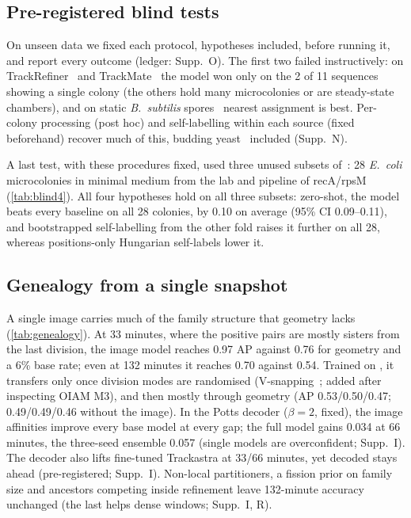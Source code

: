 

\subsection{Pre-registered blind tests}
On unseen data we fixed each protocol, hypotheses included, before running it, and report every outcome (ledger: Supp.~O).
The first two failed instructively: on TrackRefiner~\cite{ahmadi2025trackrefiner} and TrackMate~\cite{anselmet2026trackmate} the \rodsim model won only on the 2 of 11 sequences showing a single colony (the others hold many microcolonies or are steady-state chambers), and on static \emph{B.~subtilis} spores~\cite{kunzmann2026bsub} nearest assignment is best.
Per-colony processing (post hoc) and self-labelling within each source (fixed beforehand) recover much of this, budding yeast~\cite{zelic2026lyn} included (Supp.~N).

A last test, with these procedures fixed, used three unused subsets of~\cite{vanvliet2018spatially}: 28 \emph{E.~coli} microcolonies in minimal medium from the lab and pipeline of recA/rpsM (\cref{tab:blind4}).
All four hypotheses hold on all three subsets: zero-shot, the \rodsim model beats every baseline on all 28 colonies, by 0.10 on average (95\% CI 0.09--0.11), and bootstrapped self-labelling from the other fold raises it further on all 28, whereas positions-only Hungarian self-labels lower it.





\subsection{Genealogy from a single snapshot}
A single image carries much of the family structure that geometry lacks (\cref{tab:genealogy}).
At 33 minutes, where the positive pairs are mostly sisters from the last division, the image model reaches 0.97 AP against 0.76 for geometry and a 6\% base rate; even at 132 minutes it reaches 0.70 against 0.54.
Trained on \rodsim, it transfers only once division modes are randomised (V-snapping~\cite{messelink2021single}; added after inspecting OIAM M3), and then mostly through geometry (AP 0.53/0.50/0.47; 0.49/0.49/0.46 without the image).
In the Potts decoder ($\beta{=}2$, fixed), the image affinities improve every base model at every gap; the full model gains 0.034 at 66 minutes, the three-seed ensemble 0.057 (single models are overconfident; Supp.~I).
The decoder also lifts fine-tuned Trackastra at 33/66 minutes, yet decoded \ours stays ahead (pre-registered; Supp.~I). Non-local partitioners, a fission prior on family size and ancestors competing inside refinement leave 132-minute accuracy unchanged (the last helps dense windows; Supp.~I, R).


